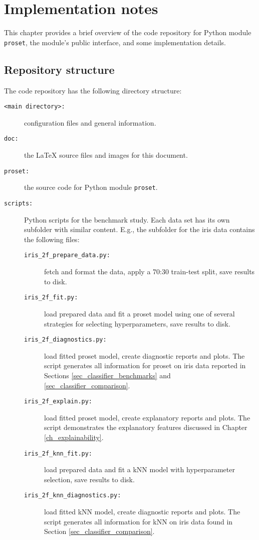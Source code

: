 \chapter{Implementation notes}
\label{ch_implementation}
%
This chapter provides a brief overview of the code repository for Python module \texttt{proset}, the module's public interface, and some implementation details.
%
\section{Repository structure}
\label{sec_repository}
%
The code repository has the following directory structure:
%
\begin{description}
\item[\texttt{<main directory>:}] configuration files and general information.
%
\item[\texttt{doc:}] the LaTeX source files and images for this document.
%
\item[\texttt{proset:}] the source code for Python module \texttt{proset}.
%
\item[\texttt{scripts:}] Python scripts for the benchmark study.
Each data set has its own subfolder with similar content.
E.g., the subfolder for the iris data contains the following files:
%
\begin{description}
\item[\texttt{iris\_2f\_prepare\_data.py:}] fetch and format the data, apply a 70:30 train-test split, save results to disk.
%
\item[\texttt{iris\_2f\_fit.py:}] load prepared data and fit a proset model using one of several strategies for selecting hyperparameters, save results to disk.
%
\item[\texttt{iris\_2f\_diagnostics.py:}] load fitted proset model, create diagnostic reports and plots.
The script generates all information for proset on iris data reported in Sections \ref{sec_classifier_benchmarks} and \ref{sec_classifier_comparison}.
%
\item[\texttt{iris\_2f\_explain.py:}] load fitted proset model, create explanatory reports and plots.
The script demonstrates the explanatory features discussed in Chapter \ref{ch_explainability}.
%
\item[\texttt{iris\_2f\_knn\_fit.py:}] load prepared data and fit a kNN model with hyperparameter selection, save results to disk.
%
\item[\texttt{iris\_2f\_knn\_diagnostics.py:}] load fitted kNN model, create diagnostic reports and plots.
The script generates all information for kNN on iris data found in Section \ref{sec_classifier_comparison}.

\end{description}
\end{description}
